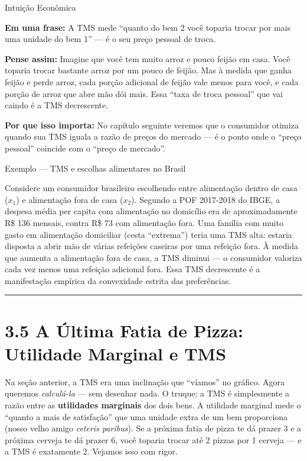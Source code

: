 \documentclass[11pt,twoside,openright]{book}
\begin{document}
\begin{intuitionbox}{Intuição Econômica}

\textbf{Em uma frase:} A TMS mede ``quanto do bem 2 você toparia trocar
por mais uma unidade do bem 1'' --- é o seu preço pessoal de troca.

\textbf{Pense assim:} Imagine que você tem muito arroz e pouco feijão em
casa. Você toparia trocar bastante arroz por um pouco de feijão. Mas à
medida que ganha feijão e perde arroz, cada porção adicional de feijão
vale menos para você, e cada porção de arroz que abre mão dói mais. Essa
``taxa de troca pessoal'' que vai caindo é a TMS decrescente.

\textbf{Por que isso importa:} No capítulo seguinte veremos que o
consumidor otimiza quando sua TMS iguala a razão de preços do mercado
--- é o ponto onde o ``preço pessoal'' coincide com o ``preço de
mercado''.

\end{intuitionbox}

\begin{infobox}{Exemplo — TMS e escolhas alimentares no Brasil}

Considere um consumidor brasileiro escolhendo entre alimentação dentro
de casa (\(x_1\)) e alimentação fora de casa (\(x_2\)). Segundo a POF
2017-2018 do IBGE, a despesa média per capita com alimentação no
domicílio era de aproximadamente R\$ 136 mensais, contra R\$ 73 com
alimentação fora. Uma família com muito gasto em alimentação domiciliar
(cesta ``extrema'') teria uma TMS alta: estaria disposta a abrir mão de
várias refeições caseiras por uma refeição fora. À medida que aumenta a
alimentação fora de casa, a TMS diminui --- o consumidor valoriza cada
vez menos uma refeição adicional fora. Essa TMS decrescente é a
manifestação empírica da convexidade estrita das preferências.

\end{infobox}

\begin{center}\rule{0.5\linewidth}{0.5pt}\end{center}

\section{3.5 A Última Fatia de Pizza: Utilidade Marginal e
TMS}\label{a-uxfaltima-fatia-de-pizza-utilidade-marginal-e-tms}

Na seção anterior, a TMS era uma inclinação que ``víamos'' no gráfico.
Agora queremos \emph{calculá-la} --- sem desenhar nada. O truque: a TMS
é simplesmente a razão entre as \textbf{utilidades marginais} dos dois
bens. A utilidade marginal mede o ``quanto a mais de satisfação'' que
uma unidade extra de um bem proporciona (nosso velho amigo \emph{ceteris
paribus}). Se a próxima fatia de pizza te dá prazer 3 e a próxima
cerveja te dá prazer 6, você toparia trocar até 2 pizzas por 1 cerveja
--- e a TMS é exatamente 2. Vejamos isso com rigor.
\end{document}
